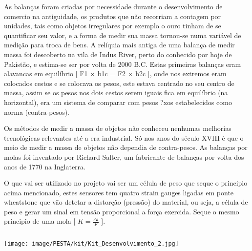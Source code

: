 
{
	As balanças foram criadas por necessidade durante o desenvolvimento de comercio na antiguidade, os produtos que não recorriam a contagem por unidades, tais como objetos irregulares por exemplo o ouro tinham de se quantificar seu valor, e a forma de medir sua massa tornou-se numa variável de medição para troca de bens. A relíquia mais antiga de uma balança de medir massa foi descoberto na vila de Indus River, perto do conhecido por hoje de Pakistão, e estima-se ser por volta de 2000 B.C.
	Estas primeiras balanças eram alavancas em equilíbrio [ F1 × b1c = F2 × b2c ], onde nos extremos eram colocados cestos e se colocava os pesos, este estava centrado no seu centro de massa, assim se os pesos nos dois cestos serem iguais fica em equilíbrio (na horizontal), era um sistema de comparar com pesos ?xos estabelecidos como norma (contra-pesos).
	
	Os métodos de medir a massa de objetos não conheceu nenhumas melhorias tecnológicas relevantes até a era industrial. Só nos anos do século XVIII é que o meio de medir a massa de objetos não dependia de contra-pesos. As balanças por molas foi inventado por Richard Salter, um fabricante de balanças por volta dos anos de 1770 na Inglaterra.
	
	O que vai ser utilizado no projeto vai ser um célula de peso que seque o principio acima mencionado, estes sensores tem quatro strain gauges ligadas em ponte wheatstone que vão detetar a distorção (pressão) do material, ou seja, a célula de peso e gerar um sinal em tensão proporcional a força exercida. Seque o mesmo principio de uma mola [ $K= \frac{\Delta l}{F}$ ].
}

\begin{columns}
	
\end{columns}

\begin{columns}
	{
		\begin{tikzfigure}
			\texttt{[image: image/PESTA/kit/Kit\_Desenvolvimento\_2.jpg]}
		\end{tikzfigure}
	}
\end{columns}

